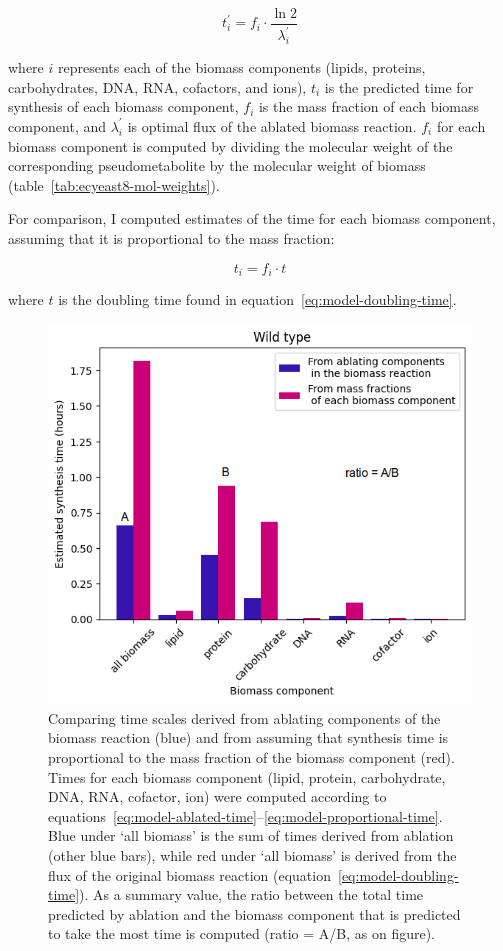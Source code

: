 \begin{equation}
  t_{i}^{\prime} = f_{i} \cdot \frac{\ln 2}{\lambda_{i}^{\prime}}
  \label{eq:model-ablated-time}
\end{equation}

where $i$ represents each of the biomass components (lipids, proteins, carbohydrates, DNA, RNA, cofactors, and ions), $t_{i}$ is the predicted time for synthesis of each biomass component, $f_{i}$ is the mass fraction of each biomass component, and $\lambda_{i}^{\prime}$ is optimal flux of the ablated biomass reaction.
$f_{i}$ for each biomass component is computed by dividing the molecular weight of the corresponding pseudometabolite by the molecular weight of biomass (table~\ref{tab:ecyeast8-mol-weights}).

For comparison, I computed estimates of the time for each biomass component, assuming that it is proportional to the mass fraction:

\begin{equation}
  t_{i} = f_{i} \cdot t
  \label{eq:model-proportional-time}
\end{equation}

where $t$ is the doubling time found in equation~\ref{eq:model-doubling-time}.

\begin{figure}
  \centering
  \includegraphics[width=.9\linewidth]{ablation_example_ratio.png}
  \caption{
    Comparing time scales derived from ablating components of the biomass reaction (blue) and from assuming that synthesis time is proportional to the mass fraction of the biomass component (red).
    Times for each biomass component (lipid, protein, carbohydrate, DNA, RNA, cofactor, ion) were computed according to equations~\ref{eq:model-ablated-time}--\ref{eq:model-proportional-time}.
    Blue under `all biomass' is the sum of times derived from ablation (other blue bars), while red under `all biomass' is derived from the flux of the original biomass reaction (equation~\ref{eq:model-doubling-time}).
    As a summary value, the ratio between the total time predicted by ablation and the biomass component that is predicted to take the most time is computed (ratio = A/B, as on figure).
  }
  \label{fig:model-ablate-times}
\end{figure}

